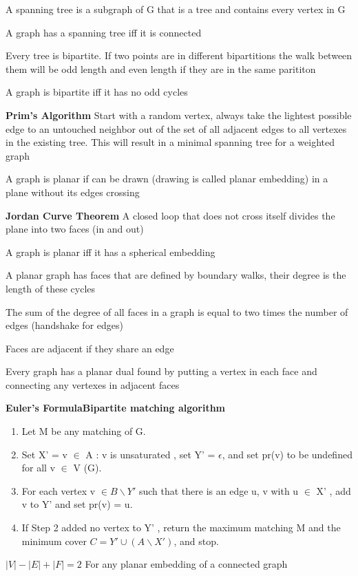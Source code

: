 \documentclass[12pt]{article}
\begin{document}
A spanning tree is a subgraph of G that is a tree and contains every vertex in G

A graph has a spanning tree iff it is connected

Every tree is bipartite. If two points are in different bipartitions the walk between them will be odd length and even length if they are in the same parititon

A graph is bipartite iff it has no odd cycles

\textbf{Prim's Algorithm}
Start with a random vertex, always take the lightest possible edge to an untouched neighbor out of the set of all adjacent edges to all vertexes in the existing tree. This will result in a minimal spanning tree for a weighted graph

A graph is planar if can be drawn (drawing is called planar embedding) in a plane without its edges crossing

\textbf{Jordan Curve Theorem} A closed loop that does not cross itself divides the plane into two faces (in and out)

A graph is planar iff it has a spherical embedding

A planar graph has faces that are defined by boundary walks, their degree is the length of these cycles

The sum of the degree of all faces in a graph is equal to two times the number of edges (handshake for edges)

Faces are adjacent if they share an edge

Every graph has a planar dual found by putting a vertex in each face and connecting any vertexes in adjacent faces

\textbf{Euler's Formula}\textbf{Bipartite matching algorithm}
\begin{enumerate}
    \item Let M be any matching of G.
    \item Set X' = {v $\in$ A : v is unsaturated }, set Y' = $\epsilon$, and set pr(v) to be undefined for all v $\in$ V (G).
    \item For each vertex v $\in B \backslash Y'$ such that there is an edge {u, v} with u $\in$ X' , add v to Y' and set pr(v) = u.
    \item If Step 2 added no vertex to Y' , return the maximum matching M and the minimum cover $C = Y' \cup (A \backslash X' )$, and stop.
\end{enumerate}
$|V| - |E| + |F| = 2$
For any planar embedding of a connected graph
\end{document}
